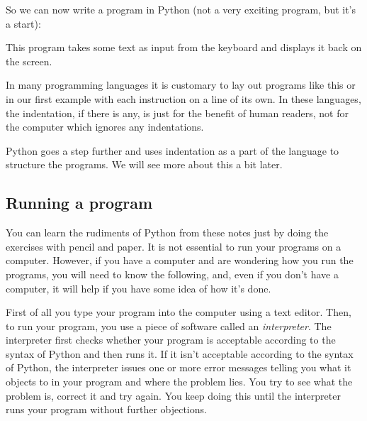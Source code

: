 So we can now write a program in Python (not a very exciting program,
but it's a start):


This program takes some text as input from the keyboard and displays it
back on the screen.

In many programming languages it is customary to lay out programs like this
or in our first example with each instruction on a line of its own.
In these languages, the indentation, if there is any, is just for the benefit
of human readers, not for the computer which ignores any indentations.

Python goes a step further and uses indentation as a part of the language
to structure the programs. We will see more about this a bit later.

\subsection{Running a program}

You can learn the rudiments of Python from these notes just by doing the
exercises with pencil and paper.  It is not essential to run your programs
on a computer.  However, if you have a computer and are wondering how
you run the programs, you will need to know the following, and, even if you don't have
a computer, it will help if you have some idea of how it's done.

First of all you type your program into the computer using a text
editor.
Then, to run your program, you use a piece of software called
an \emph{interpreter}.
The interpreter first checks whether your program is acceptable according
to the syntax of Python and then runs it.
If it isn't acceptable according to the syntax of Python,
the interpreter issues one or more error messages telling you
what it objects to in your program and where the problem lies.
You try to see what the problem is, correct it and try again.  You keep
doing this until the interpreter runs your program without further
objections.

